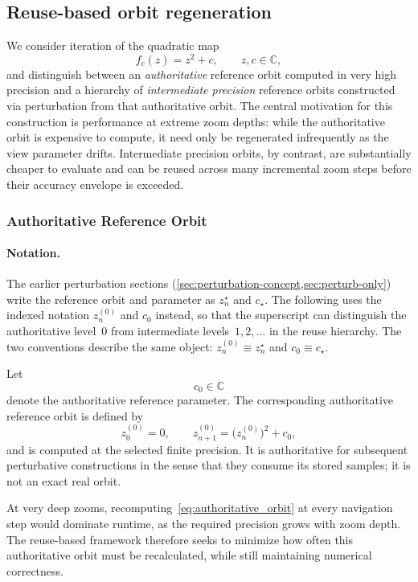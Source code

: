 \subsection{Reuse-based orbit regeneration}
\label{subsec:ref-orbit-reuse}

We consider iteration of the quadratic map
\[
f_c(z) = z^2 + c,\qquad z,c \in \mathbb{C},
\]
and distinguish between an \emph{authoritative} reference orbit computed in very high precision and a hierarchy of
\emph{intermediate precision} reference orbits constructed via perturbation from that authoritative orbit.
The central motivation for this construction is performance at extreme zoom depths: while the authoritative orbit
is expensive to compute, it need only be regenerated infrequently as the view parameter drifts.
Intermediate precision orbits, by contrast, are substantially cheaper to evaluate and can be reused across many
incremental zoom steps before their accuracy envelope is exceeded.

\subsubsection{Authoritative Reference Orbit}

\paragraph{Notation.}
The earlier perturbation sections
(\cref{sec:perturbation-concept,sec:perturb-only})
write the reference orbit and parameter as
\(z_n^\star\) and \(c_\star\).
The following uses the indexed notation
\(z^{(0)}_n\) and \(c_0\) instead, so that the superscript can
distinguish the authoritative level~\(0\) from intermediate
levels~\(1,2,\ldots\) in the reuse hierarchy.
The two conventions describe the same object:
\(z^{(0)}_n \equiv z_n^\star\) and \(c_0 \equiv c_\star\).

Let
\[
c_0 \in \mathbb{C}
\]
denote the authoritative reference parameter.
The corresponding authoritative reference orbit is defined by
\begin{equation}
z^{(0)}_0 = 0, \qquad
z^{(0)}_{n+1} = \bigl(z^{(0)}_n\bigr)^2 + c_0,
\label{eq:authoritative_orbit}
\end{equation}
and is computed at the selected finite precision.  It is authoritative for
subsequent perturbative constructions in the sense that they consume its stored
samples; it is not an exact real orbit.

At very deep zooms, recomputing~\eqref{eq:authoritative_orbit} at every navigation step would dominate runtime,
as the required precision grows with zoom depth.
The reuse-based framework therefore seeks to minimize how often this authoritative orbit must be recalculated,
while still maintaining numerical correctness.

